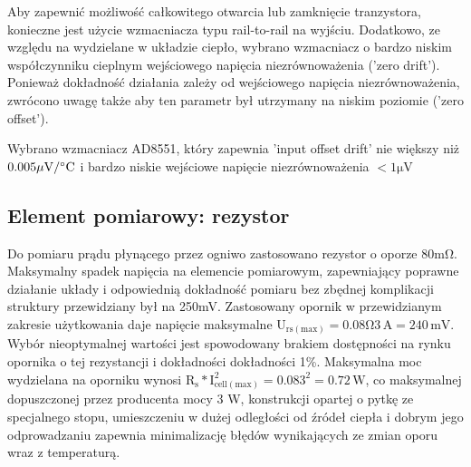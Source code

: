 \documentclass[polish,engineer]{polsl-msth}
\begin{document}
Aby zapewnić możliwość całkowitego otwarcia lub zamknięcie tranzystora, konieczne jest użycie wzmacniacza typu rail-to-rail na wyjściu. Dodatkowo, ze względu na wydzielane w układzie ciepło, wybrano wzmacniacz o bardzo niskim współczynniku cieplnym wejściowego napięcia niezrównoważenia ('zero drift'). Ponieważ dokładność działania zależy od wejściowego napięcia niezrównoważenia, zwrócono uwagę także aby ten parametr był utrzymany na niskim poziomie ('zero offset').

Wybrano wzmacniacz AD8551, który zapewnia 'input offset drift' nie większy niż $\mathrm{0.005 \mu V/\degree C}$ i bardzo niskie wejściowe napięcie niezrównoważenia $\mathrm{<1\mu V}$
\subsection{Element pomiarowy: rezystor}
Do pomiaru prądu płynącego przez ogniwo zastosowano rezystor o oporze $\mathrm{80m\Omega}$. Maksymalny spadek napięcia na elemencie pomiarowym, zapewniający poprawne działanie układy i odpowiednią dokładność pomiaru bez zbędnej komplikacji struktury przewidziany był na 250mV. Zastosowany opornik w przewidzianym zakresie użytkowania daje napięcie maksymalne $\mathrm{U_{rs(max)}=0.08\Omega 3\,A = 240\,mV}$. Wybór nieoptymalnej wartości jest spowodowany brakiem dostępności na rynku opornika o tej rezystancji i dokładności dokładności 1\%. Maksymalna moc wydzielana na oporniku wynosi $\mathrm{R_s*I_{cell(max)}^2 = 0.08 3^2 = 0.72\,W}$, co maksymalnej dopuszczonej przez producenta mocy 3 W, konstrukcji opartej o pytkę ze specjalnego stopu, umieszczeniu w dużej odległości od źródeł ciepła i dobrym jego odprowadzaniu zapewnia minimalizację błędów wynikających ze zmian oporu wraz z temperaturą.
\end{document}
